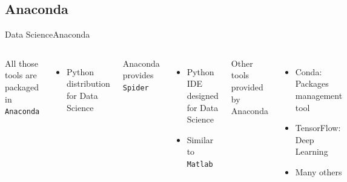 \documentclass[10pt,compress]{beamer} %
\begin{document}
\subsection{Anaconda}
\begin{frame}{Data Science}{Anaconda}
    \begin{columns}
   All those tools are packaged in \texttt{Anaconda}
   \begin{itemize}
   		\item Python distribution for Data Science
	\end{itemize}

	Anaconda provides \texttt{Spider}
	\begin{itemize}
		\item Python IDE designed for Data Science
		\item Similar to \texttt{Matlab}
	\end{itemize}

	Other tools provided by Anaconda
	\begin{itemize}
		\item Conda: Packages management tool
		\item TensorFlow: Deep Learning 
		\item Many others
	\end{itemize}

			\includegraphics[width=0.6\textwidth]{figs/Anaconda_Logo.png} \\\bigskip
			\includegraphics[width=0.6\textwidth]{figs/spyder.png}	
	\end{columns}
\end{frame}
\end{document}
